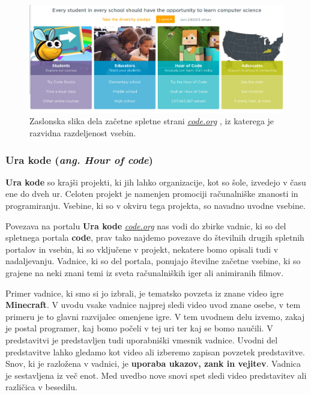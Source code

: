 \begin{figure}[h!]
    \includegraphics [width=1\linewidth, keepaspectratio =
    1] {./images/sc_web/code_main_part-v01.jpg}
    \caption{Zaslonska slika dela začetne spletne strani
      \emph{\href{https://www.code.org}{code.org}}
      \cite{web:code.org}, iz katerega je razvidna razdeljenost
      vsebin.}
    \label{fig:scr:web:code:main}
\end{figure}

\subsubsection{Ura kode (\emph{ang. Hour of code})}
\label{sec:ura-kode-ang}

\textbf{Ura kode} so krajši projekti, ki jih lahko organizacije, kot so
šole, izvedejo v času ene do dveh ur. Celoten projekt je namenjen
promociji računalniške znanosti in programiranju. Vsebine, ki so v
okviru tega projekta, so navadno uvodne vsebine.

Povezava na portalu \textbf{Ura kode}
\emph{\href{https://code.org}{code.org}} nas vodi do zbirke vadnic, ki
so del spletnega portala \textbf{code}, prav tako najdemo povezave do
številnih drugih spletnih portalov in vsebin, ki so vključene v
projekt, nekatere bomo opisali tudi v nadaljevanju. Vadnice, ki so
del portala, ponujajo številne začetne vsebine, ki so grajene na neki
znani temi iz sveta računalniških iger ali animiranih filmov.

Primer vadnice, ki smo si jo izbrali, je tematsko povzeta iz znane video
igre \textbf{Minecraft}. V uvodu vsake vadnice najprej sledi video
uvod znane osebe, v tem primeru je to glavni razvijalec omenjene
igre. V tem uvodnem delu izvemo, zakaj je postal programer, kaj
bomo počeli v tej uri ter kaj se bomo naučili. V predstavitvi je
predstavljen tudi uporabniški vmesnik vadnice. Uvodni del predstavitve
lahko gledamo kot video ali izberemo zapisan povzetek
predstavitve. Snov, ki je razložena v vadnici, je \textbf{uporaba
  ukazov, zank in vejitev}. Vadnica je sestavljena iz več enot. Med
uvedbo nove snovi spet sledi video predstavitev ali različica v
besedilu.

